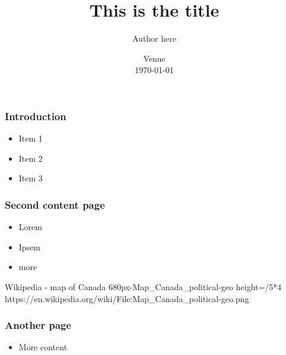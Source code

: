 \documentclass[11pt,aspectratio=169]{beamer}
\title{This is the title}
\author{Author here}
\institute 
{
  Title\\
  Division/Sector\\
  Natural Resources Canada
}
\date{Venue\\
     \today}
\begin{document}
\nrcanTitleframe

  
\begin{nrcanFrame}
  \frametitle{Introduction}
  \begin{itemize}
  \item Item 1
  \item Item 2
  \item Item 3
  \end{itemize}
\end{nrcanFrame}

\begin{nrcanFrame}
  \frametitle{Second content page}
  \begin{itemize}
  \item Lorem
  \item Ipsem
  \item more
  \end{itemize}
\end{nrcanFrame}


\nrcanGraphicFrame
  {Wikipedia - map of Canada}
  {680px-Map_Canada_political-geo}
  {height=\paperheight/5*4}
  {https://en.wikipedia.org/wiki/File:Map_Canada_political-geo.png}



\begin{nrcanFrame}
  \frametitle{Another page}
  \begin{itemize}
  \item More content
  \end{itemize}
\end{nrcanFrame}


\nrcanLastFrame
\end{document}
